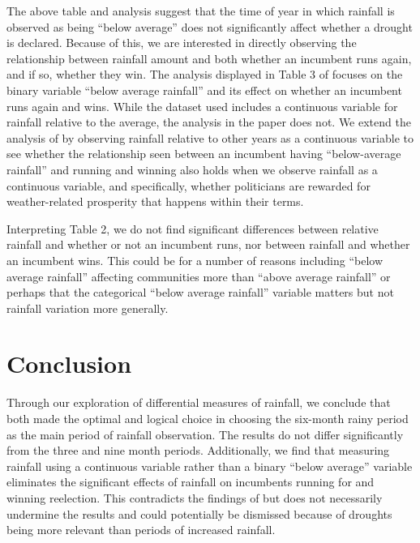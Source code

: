 \documentclass[12pt]{article}
\begin{document}
The above table and analysis suggest that the time of year in which
rainfall is observed as being ``below average'' does not significantly
affect whether a drought is declared. Because of this, we are interested
in directly observing the relationship between rainfall amount and both
whether an incumbent runs again, and if so, whether they win. The
analysis displayed in Table 3 of \citet{cooperman2021natural} focuses on
the binary variable ``below average rainfall'' and its effect on whether
an incumbent runs again and wins. While the dataset used includes a
continuous variable for rainfall relative to the average, the analysis
in the paper does not. We extend the analysis of
\citet{cooperman2021natural} by observing rainfall relative to other
years as a continuous variable to see whether the relationship seen
between an incumbent having ``below-average rainfall'' and running and
winning also holds when we observe rainfall as a continuous variable,
and specifically, whether politicians are rewarded for weather-related
prosperity that happens within their terms.

Interpreting Table 2, we do not find significant differences between
relative rainfall and whether or not an incumbent runs, nor between
rainfall and whether an incumbent wins. This could be for a number of
reasons including ``below average rainfall'' affecting communities more
than ``above average rainfall'' or perhaps that the categorical ``below
average rainfall'' variable matters but not rainfall variation more
generally.

\section{Conclusion}
\label{sec:conclusion}

Through our exploration of differential measures of rainfall, we
conclude that \citet{cooperman2021natural} both made the optimal and
logical choice in choosing the six-month rainy period as the main period
of rainfall observation. The results do not differ significantly from
the three and nine month periods. Additionally, we find that measuring
rainfall using a continuous variable rather than a binary ``below
average'' variable eliminates the significant effects of rainfall on
incumbents running for and winning reelection. This contradicts the
findings of \citet{cooperman2021natural} but does not necessarily
undermine the results and could potentially be dismissed because of
droughts being more relevant than periods of increased rainfall.
\end{document}
